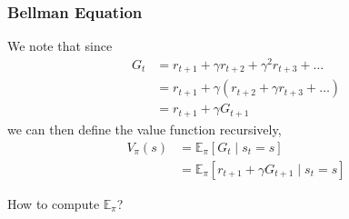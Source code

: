 \begin{frame}
	\frametitle{Bellman Equation}
We note that since 
\begin{align*}
G_t &= r_{t+1} + \gamma r_{t+2} + \gamma^2 r_{t+3} + \ldots \\
&= r_{t+1} + \gamma (r_{t+2} + \gamma r_{t+3} + \ldots) \\
&= r_{t+1} + \gamma G_{t+1}
\end{align*}
\pause
we can then define the value function recursively,
\begin{align*}
V_\pi(s) &= \mathbb{E}_\pi [G_t \mid s_t = s]\\
&= \mathbb{E}_\pi [r_{t+1} + \gamma G_{t+1} \mid s_t = s]
	\end{align*}

How to compute $\mathbb{E}_\pi$?


\end{frame}


